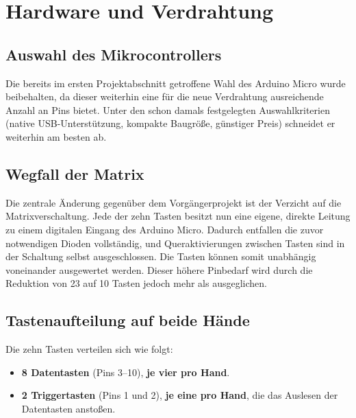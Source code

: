\documentclass{article}
\begin{document}
\section{Hardware und Verdrahtung}

\subsection{Auswahl des Mikrocontrollers}
Die bereits im ersten Projektabschnitt getroffene Wahl des Arduino Micro wurde
beibehalten, da dieser weiterhin eine für die neue Verdrahtung ausreichende
Anzahl an Pins bietet. Unter den schon damals festgelegten Auswahlkriterien (native USB-Unterstützung, kompakte Baugröße, günstiger Preis) schneidet er weiterhin am besten ab.

\subsection{Wegfall der Matrix}
Die zentrale Änderung gegenüber dem Vorgängerprojekt ist der Verzicht auf die Matrixverschaltung. Jede der zehn Tasten besitzt nun eine eigene, direkte Leitung zu einem digitalen Eingang des Arduino Micro. Dadurch entfallen die zuvor notwendigen Dioden vollständig, und Queraktivierungen zwischen Tasten sind in der Schaltung selbst ausgeschlossen. Die Tasten können somit unabhängig voneinander ausgewertet werden. Dieser höhere Pinbedarf wird durch die Reduktion von 23 auf 10 Tasten jedoch mehr als ausgeglichen.


\subsection{Tastenaufteilung auf beide Hände}
Die zehn Tasten verteilen sich wie folgt:

\begin{itemize}
    \item \textbf{8 Datentasten} (Pins 3--10), \textbf{je vier pro Hand}.
    \item \textbf{2 Triggertasten} (Pins 1 und 2), \textbf{je eine pro Hand}, die das Auslesen der Datentasten anstoßen.
\end{itemize}
\end{document}
